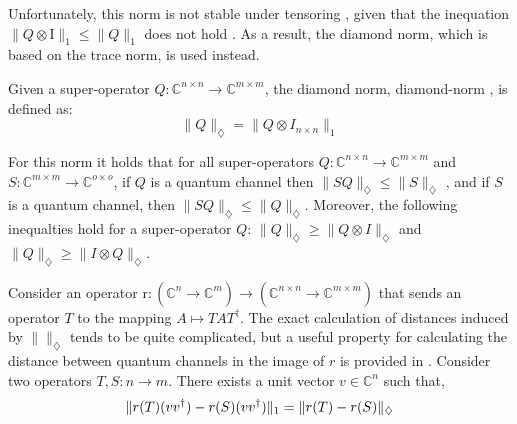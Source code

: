 Unfortunately, this norm is not stable under tensoring , given that the inequation $ \lVert Q \otimes \text{I} \rVert_{1} \leq \lVert Q \rVert_{1}$ does not hold \cite{watrous2018theory}. As a result, the diamond norm, which is based on the trace norm, is used instead. 

\begin{definition}
  Given a super-operator $Q: \mathbb{C}^{n\times n} \xrightarrow{} \mathbb{C}^{m\times m }$, the diamond norm, \gls{diamond-norm} , is defined as:
  \begin{equation}  \label{eq:diamond_distance}
    \lVert Q \rVert_{\diamondsuit} =  \lVert Q \otimes I_{n \times n} \rVert_{1}
  \end{equation}
\end{definition}

For this norm it holds that for all super-operators $Q: \mathbb{C}^{n \times n}\rightarrow \mathbb{C}^{m \times m} $ and $S:\mathbb{C}^{m \times m} \rightarrow \mathbb{C}^{o \times o} $, if $Q$ is a quantum channel then $\lVert S  Q \rVert_{\diamondsuit} \leq \lVert S \rVert_{\diamondsuit}$ \cite{watrous2018theory}, and if $S$ is a quantum channel, then $\lVert S  Q \rVert_{\diamondsuit} \leq \lVert Q \rVert_{\diamondsuit}$. Moreover, the following inequalties hold for a super-operator $Q$: $ \lVert Q \rVert_{\diamondsuit} \geq \lVert Q \otimes I \rVert_{\diamondsuit} $ and $\lVert Q \rVert_{\diamondsuit} \geq \lVert I \otimes Q  \rVert_{\diamondsuit} $.


Consider an operator  $ \text{r} : (\mathbb{C}^{n} \xrightarrow[]{} \mathbb{C}^{m}) \xrightarrow[]{} (\mathbb{C}^{n\times n}\xrightarrow[]{} \mathbb{C}^{m\times m})$ that sends an operator $T$ to the mapping $A \mapsto TAT^{\dag}$. The exact calculation of distances induced by $\lVert \rVert_{\diamondsuit}$ tends to be quite complicated, but a useful property for calculating the distance between quantum channels in the image of $r$ is provided in \cite{watrous2018theory}.
Consider two operators $T, S : n \xrightarrow{} m$. There exists a unit vector $v \in \mathbb{C}^{n}$ such that, 
\begin{equation} \label{eq:norm_iso_r}
\begin{centering}
\lVert r(T) (vv^{\dag})-r(S) (vv^{\dag}) \rVert_{1} = \lVert r(T)-r(S) \rVert_{\diamondsuit}
 \end{centering}
\end{equation}

